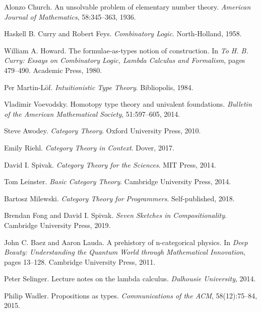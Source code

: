 \documentclass[11pt,a4paper]{article}
\begin{document}
\begin{thebibliography}{99}
Alonzo Church.
\newblock An unsolvable problem of elementary number theory.
\newblock \emph{American Journal of Mathematics}, 58:345--363, 1936.

Haskell B. Curry and Robert Feys.
\newblock \emph{Combinatory Logic}.
\newblock North-Holland, 1958.

William A. Howard.
\newblock The formulae-as-types notion of construction.
\newblock In \emph{To H. B. Curry: Essays on Combinatory Logic, Lambda Calculus and Formalism}, pages 479--490. Academic Press, 1980.

Per Martin-Löf.
\newblock \emph{Intuitionistic Type Theory}.
\newblock Bibliopolis, 1984.

Vladimir Voevodsky.
\newblock Homotopy type theory and univalent foundations.
\newblock \emph{Bulletin of the American Mathematical Society}, 51:597--605, 2014.

Steve Awodey.
\newblock \emph{Category Theory}.
\newblock Oxford University Press, 2010.

Emily Riehl.
\newblock \emph{Category Theory in Context}.
\newblock Dover, 2017.

David I. Spivak.
\newblock \emph{Category Theory for the Sciences}.
\newblock MIT Press, 2014.

Tom Leinster.
\newblock \emph{Basic Category Theory}.
\newblock Cambridge University Press, 2014.

Bartosz Milewski.
\newblock \emph{Category Theory for Programmers}.
\newblock Self-published, 2018.

Brendan Fong and David I. Spivak.
\newblock \emph{Seven Sketches in Compositionality}.
\newblock Cambridge University Press, 2019.

John C. Baez and Aaron Lauda.
\newblock A prehistory of n-categorical physics.
\newblock In \emph{Deep Beauty: Understanding the Quantum World through Mathematical Innovation}, pages 13--128. Cambridge University Press, 2011.

Peter Selinger.
\newblock Lecture notes on the lambda calculus.
\newblock \emph{Dalhousie University}, 2014.

Philip Wadler.
\newblock Propositions as types.
\newblock \emph{Communications of the ACM}, 58(12):75--84, 2015.


\end{thebibliography}
\end{document}
